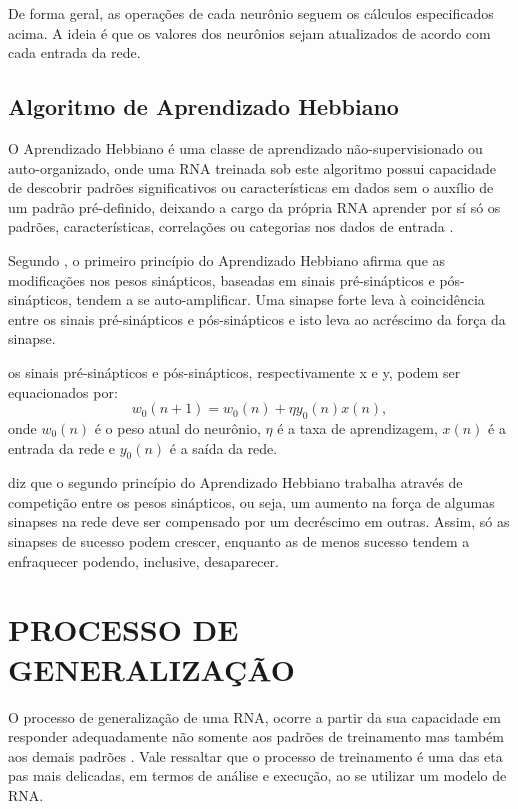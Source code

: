 De forma geral, as operações de cada neurônio seguem os cálculos especificados acima. A ideia é que os valores dos neurônios sejam atualizados de acordo com cada entrada da rede. 

\subsection{Algoritmo de Aprendizado Hebbiano}
O Aprendizado Hebbiano é uma classe de aprendizado não-supervisionado ou auto-organizado, onde uma RNA treinada sob este algoritmo possui capacidade de descobrir padrões significativos ou características em dados sem o auxílio de um padrão pré-definido, deixando a cargo da própria RNA aprender por sí só os padrões, características, correlações ou categorias nos dados de entrada \cite{castro}.

Segundo , o primeiro princípio do Aprendizado Hebbiano afirma que as modificações nos pesos sinápticos, baseadas em sinais pré-sinápticos e pós-sinápticos, tendem a se auto-amplificar. Uma sinapse forte leva à coincidência entre os sinais pré-sinápticos e pós-sinápticos e isto leva ao acréscimo da força da sinapse.

os sinais pré-sinápticos e pós-sinápticos, respectivamente x e y, podem ser equacionados por:
\begin{equation}\label{eq:hebbiano}
w_{0} (n + 1) = w_{0}(n)+ \eta y_0(n)x(n),
\end{equation}
onde $w_{0}(n)$ é o peso atual do neurônio, $\eta$ é a taxa de aprendizagem, $x(n)$ é a entrada da rede e $y_0(n)$ é a saída da rede.

 diz que o segundo princípio do Aprendizado Hebbiano trabalha através de competição entre os pesos sinápticos, ou seja, um aumento na força de algumas sinapses na rede deve ser compensado por um decréscimo em outras. Assim, só as sinapses de sucesso podem crescer, enquanto as de menos sucesso tendem a enfraquecer podendo, inclusive, desaparecer.

\section{PROCESSO DE GENERALIZAÇÃO}\label{rna-generalização}
O processo de generalização de uma RNA, ocorre a partir da sua capacidade em responder adequadamente não somente aos padrões de treinamento mas também aos demais padrões \cite{medeiros}. Vale ressaltar que o processo de treinamento é uma das eta	pas mais delicadas, em termos de análise e execução, ao se utilizar um modelo de RNA.

